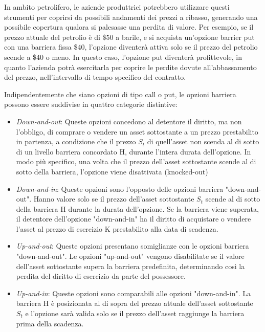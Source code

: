 \documentclass[12pt,a4paper]{report}
\begin{document}
In ambito petrolifero, le aziende produttrici potrebbero utilizzare questi strumenti per coprirsi da possibili andamenti dei prezzi a ribasso, generando una possibile copertura qualora si palesasse una perdita di valore. Per esempio, se il prezzo attuale del petrolio è di \$50 a barile, e si acquista un'opzione barrier put con una barriera fissa \$40, l'opzione diventerà attiva solo se il prezzo del petrolio scende a \$40 o meno. In questo caso, l'opzione put diventerà profittevole, in quanto l'azienda potrà esercitarla per coprire le perdite dovute all'abbassamento del prezzo, nell'intervallo di tempo specifico del contratto.

Indipendentemente che siano opzioni di tipo call o put, le opzioni barriera possono essere suddivise in quattro categorie distintive:

\begin{itemize}
    \item \textit{Down-and-out}: Queste opzioni concedono al detentore il diritto, ma non l'obbligo, di comprare o vendere un asset sottostante a un prezzo prestabilito in partenza, a condizione che il prezzo $S_t$ di quell'asset non scenda al di sotto di un livello barriera concordato H, durante l'intera durata dell'opzione. In modo più specifico, una volta che il prezzo dell'asset sottostante scende al di sotto della barriera, l'opzione viene disattivata (knocked-out)
    \item \textit{Down-and-in}: Queste opzioni sono l'opposto delle opzioni barriera "down-and-out". Hanno valore solo se il prezzo dell'asset sottostante $S_t$ scende al di sotto della barriera H durante la durata dell'opzione. Se la barriera viene superata, il detentore dell'opzione "down-and-in" ha il diritto di acquistare o vendere l'asset al prezzo di esercizio K prestabilito alla data di scadenza.
    \item \textit{Up-and-out}: Queste opzioni presentano somiglianze con le opzioni barriera "down-and-out". Le opzioni "up-and-out" vengono disabilitate se il valore dell'asset sottostante supera la barriera predefinita, determinando così la perdita del diritto di esercizio da parte del possessore.
    \item \textit{Up-and-in}: Queste opzioni sono comparabili alle opzioni "down-and-in". La barriera H è posizionata al di sopra del prezzo attuale dell'asset sottostante $S_t$ e l'opzione sarà valida solo se il prezzo dell'asset raggiunge la barriera prima della scadenza.
\end{itemize}
\end{document}
